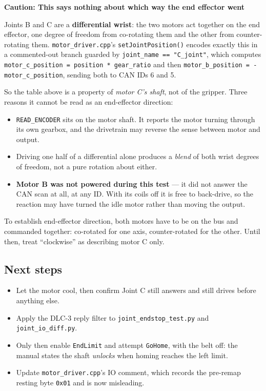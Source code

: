 \documentclass[11pt,letterpaper]{article}
\newenvironment{caution}[1]{%
    \par\addvspace{8pt}%
    \noindent{\color{cautionred}\rule{\linewidth}{0.8pt}}\par\vspace{2pt}
    \noindent\textbf{\color{cautionred}Caution: #1}\par\vspace{2pt}
}{%
    \par\vspace{2pt}\noindent{\color{cautionred}\rule{\linewidth}{0.4pt}}%
    \par\addvspace{8pt}%
}
\begin{document}
\begin{caution}{This says nothing about which way the end effector went}
Joints B and C are a \textbf{differential wrist}: the two motors act together on the
end effector, one degree of freedom from co-rotating them and the other from
counter-rotating them. \texttt{motor\_driver.cpp}'s \texttt{setJointPosition()}
encodes exactly this in a commented-out branch guarded by
\texttt{joint\_name == "C\_joint"}, which computes
\texttt{motor\_c\_position = position * gear\_ratio} and then
\texttt{motor\_b\_position = -motor\_c\_position}, sending both to CAN IDs 6 and 5.

So the table above is a property of \emph{motor C's shaft}, not of the gripper.
Three reasons it cannot be read as an end-effector direction:
\begin{itemize}
    \item \texttt{READ\_ENCODER} sits on the motor shaft. It reports the motor
    turning through its own gearbox, and the drivetrain may reverse the sense
    between motor and output.
    \item Driving one half of a differential alone produces a \emph{blend} of both
    wrist degrees of freedom, not a pure rotation about either.
    \item \textbf{Motor B was not powered during this test} --- it did not answer
    the CAN scan at all, at any ID. With its coils off it is free to back-drive, so
    the reaction may have turned the idle motor rather than moving the output.
\end{itemize}

To establish end-effector direction, both motors have to be on the bus and
commanded together: co-rotated for one axis, counter-rotated for the other. Until
then, treat ``clockwise'' as describing motor C only.
\end{caution}

\subsection{Next steps}
\begin{itemize}
    \item Let the motor cool, then confirm Joint C still answers and still
    drives before anything else.
    \item Apply the DLC-3 reply filter to \texttt{joint\_endstop\_test.py} and
    \texttt{joint\_io\_diff.py}.
    \item Only then enable \texttt{EndLimit} and attempt \texttt{GoHome}, with
    the belt off: the manual states the shaft \emph{unlocks} when homing reaches
    the left limit.
    \item Update \texttt{motor\_driver.cpp}'s IO comment, which records the
    pre-remap resting byte \texttt{0x01} and is now misleading.
\end{itemize}
\end{document}
